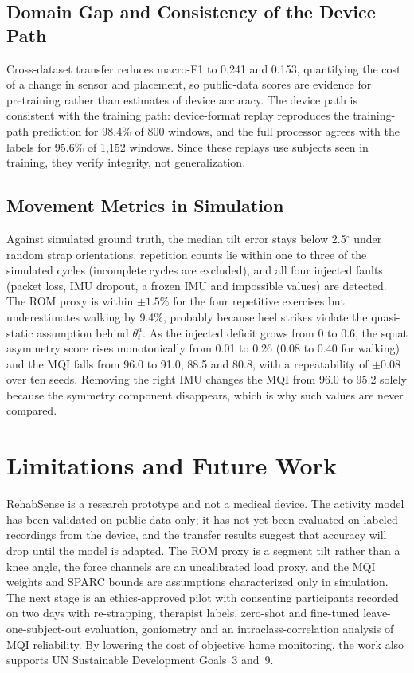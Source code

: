 \documentclass[conference]{IEEEtran}
\begin{document}
\subsection{Domain Gap and Consistency of the Device Path}
Cross-dataset transfer reduces macro-F1 to 0.241 and 0.153, quantifying the cost of a change in sensor and placement, so public-data scores are evidence for pretraining rather than estimates of device accuracy. The device path is consistent with the training path: device-format replay reproduces the training-path prediction for 98.4\% of 800 windows, and the full processor agrees with the labels for 95.6\% of 1{,}152 windows. Since these replays use subjects seen in training, they verify integrity, not generalization.

\subsection{Movement Metrics in Simulation}
Against simulated ground truth, the median tilt error stays below 2.5$^\circ$ under random strap orientations, repetition counts lie within one to three of the simulated cycles (incomplete cycles are excluded), and all four injected faults (packet loss, IMU dropout, a frozen IMU and impossible values) are detected. The ROM proxy is within $\pm1.5$\% for the four repetitive exercises but underestimates walking by 9.4\%, probably because heel strikes violate the quasi-static assumption behind $\theta^{a}_t$. As the injected deficit grows from 0 to 0.6, the squat asymmetry score rises monotonically from 0.01 to 0.26 (0.08 to 0.40 for walking) and the MQI falls from 96.0 to 91.0, 88.5 and 80.8, with a repeatability of $\pm0.08$ over ten seeds. Removing the right IMU changes the MQI from 96.0 to 95.2 solely because the symmetry component disappears, which is why such values are never compared.

\section{Limitations and Future Work}
RehabSense is a research prototype and not a medical device. The activity model has been validated on public data only; it has not yet been evaluated on labeled recordings from the device, and the transfer results suggest that accuracy will drop until the model is adapted. The ROM proxy is a segment tilt rather than a knee angle, the force channels are an uncalibrated load proxy, and the MQI weights and SPARC bounds are assumptions characterized only in simulation. The next stage is an ethics-approved pilot with consenting participants recorded on two days with re-strapping, therapist labels, zero-shot and fine-tuned leave-one-subject-out evaluation, goniometry and an intraclass-correlation analysis of MQI reliability. By lowering the cost of objective home monitoring, the work also supports UN Sustainable Development Goals~3 and~9.
\end{document}
